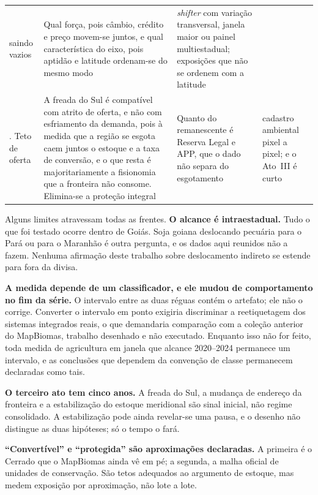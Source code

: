 \begin{quadro}[htb]
\begin{tabular}{p{1.9cm}p{4.2cm}p{4.0cm}p{4.0cm}}
saindo vazios &
Qual força, pois câmbio, crédito e preço movem-se juntos, e qual característica
do eixo, pois aptidão e latitude ordenam-se do mesmo modo &
\emph{shifter} com variação transversal, janela maior ou painel
multiestadual; exposições que não se ordenem com a latitude \\
\addlinespace
4. Teto de oferta &
A freada do Sul é compatível com atrito de oferta, e não com esfriamento da
demanda, pois à medida que a região se esgota caem juntos o estoque e a taxa de
conversão, e o que resta é majoritariamente a fisionomia que a fronteira não
consome. Elimina-se a proteção integral &
Quanto do remanescente é Reserva Legal e APP, que o dado não separa do
esgotamento &
cadastro ambiental pixel a pixel; e o Ato~III é curto \\
\bottomrule
\end{tabular}
\end{quadro}

Alguns limites atravessam todas as frentes. \textbf{O alcance é intraestadual.}
Tudo o que foi testado ocorre dentro de
Goiás. Soja goiana deslocando pecuária para o Pará ou para o Maranhão é outra
pergunta, e os dados aqui reunidos não a fazem. Nenhuma afirmação deste
trabalho sobre deslocamento indireto se estende para fora da divisa.

\textbf{A medida depende de um classificador, e ele mudou de comportamento no
fim da série.} O intervalo entre as duas réguas contém o artefato; ele não o
corrige. Converter o intervalo em ponto exigiria discriminar a reetiquetagem
dos sistemas integrados reais, o que demandaria comparação com a coleção
anterior do MapBiomas, trabalho desenhado e não executado. Enquanto isso
não for feito, toda medida de agricultura em janela que alcance 2020--2024
permanece um intervalo, e as conclusões que dependem da convenção de classe
permanecem declaradas como tais.

\textbf{O terceiro ato tem cinco anos.} A freada do Sul, a mudança de endereço
da fronteira e a estabilização do estoque meridional são sinal inicial, não
regime consolidado. A estabilização pode ainda revelar-se uma pausa, e o
desenho não distingue as duas hipóteses; só o tempo o fará.

\textbf{``Convertível'' e ``protegida'' são aproximações declaradas.} A
primeira é o Cerrado que o MapBiomas ainda vê em pé; a segunda, a malha
oficial de unidades de conservação. São tetos adequados ao argumento de
estoque, mas medem exposição por aproximação, não lote a lote.

